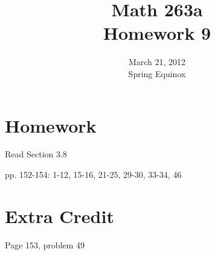 \documentclass{exam}
\title{Math 263a \\ Homework 9}
\date{March 21, 2012 \\ Spring Equinox}
\begin{document}
\maketitle

\section{Homework}

\begin{itemize*}
  \item Read Section 3.8
  \item pp. 152-154: 1-12, 15-16, 21-25, 29-30, 33-34, 46
\end{itemize*}

\section{Extra Credit}
Page 153, problem 49
\end{document}
